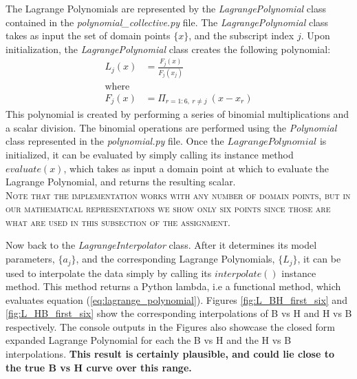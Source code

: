 \documentclass[11pt]{article}
\begin{document}
The Lagrange Polynomials are represented by the \textit{LagrangePolynomial} class contained in the \textit{polynomial\_collective.py} file. The \textit{LagrangePolynomial} class takes as input the set of domain points $\{x\}$, and the subscript index $j$. Upon initialization, the \textit{LagrangePolynomial} class creates the following polynomial:
\begin{align*}
L_j(x) &= \frac{F_j(x)}{F_j(x_j)}\\
\text{where}\\
F_j(x) &= \Pi_{r=1:6, \ r \neq j} \  (x - x_r)
\end{align*}
This polynomial is created by performing a series of binomial multiplications and a scalar division. The binomial operations are performed using the \textit{Polynomial} class represented in the \textit{polynomial.py} file. Once the $LagrangePolynomial$ is initialized, it can be evaluated by simply calling its instance method $evaluate(x)$, which takes as input a domain point at which to evaluate the Lagrange Polynomial, and returns the resulting scalar.\\
\textsc{\footnotesize *Note that the implementation works with any number of domain points, but in our mathematical representations we show only six points since those are what are used in this subsection of the assignment.}

Now back to the \textit{LagrangeInterpolator} class. After it determines its model parameters, $\{a_j\}$, and the corresponding Lagrange Polynomials, $\{L_j\}$, it can be used to interpolate the data simply by calling its $interpolate()$ instance method. This method returns a Python lambda, i.e a functional method, which evaluates equation (\ref{eq:lagrange_polynomial}). Figures \ref{fig:L_BH_first_six} and \ref{fig:L_HB_first_six} show the corresponding interpolations of B vs H and H vs B respectively. The console outputs in the Figures also showcase the closed form expanded Lagrange Polynomial for each the B vs H and the H vs B interpolations. \textbf{This result is certainly plausible, and could lie close to the true B vs H curve over this range.}
\end{document}
